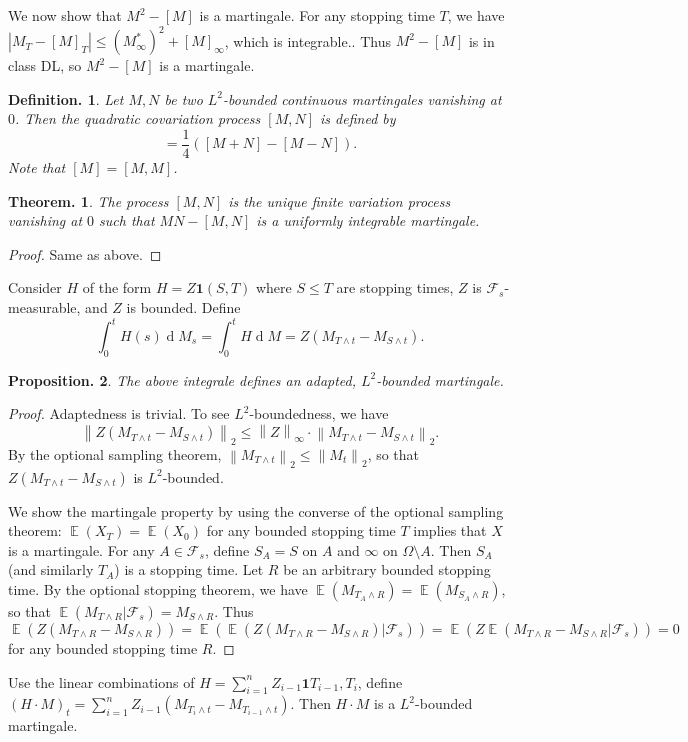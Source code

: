 \documentclass[11pt, a4paper]{memoir}
\newcommand{\norm}[1]{\ensuremath{\left\lVert#1\right\rVert}}
\theoremstyle{change}
\newtheorem{theorem}{Theorem.}[section]
\newtheorem{proposition}[theorem]{Proposition.}
\theoremstyle{plain}
\theoremstyle{nonumberplain}
\newtheorem{definition}{Definition.}
\newtheorem{proof}{Proof}
\DeclareMathOperator{\E}{{\mathbb{E}}}
\renewcommand{\d}[1]{\ensuremath{\operatorname{d}\!{#1}}}
\newcommand{\idc}{\mathbf{1}}
\numberwithin{equation}{section}
\begin{document}
We now show that $M^2-[M]$ is a martingale.
For any stopping time $T$, we have $|M_T-[M]_T|\leq(M_\infty^*)^2+[M]_\infty$, which is integrable..
Thus $M^2-[M]$ is in class DL, so $M^2-[M]$ is a martingale.
\begin{definition}
    Let $M,N$ be two $L^2$-bounded continuous martingales vanishing at $0$.
    Then the quadratic covariation process $[M,N]$ is defined by
    \begin{equation*}
        [M,N]=\frac{1}{4}([M+N]-[M-N]).
    \end{equation*}
    Note that $[M]=[M,M]$.
\end{definition}
\begin{theorem}
    The process $[M,N]$ is the unique finite variation process vanishing at $0$ such that $MN-[M,N]$ is a uniformly integrable martingale.
\end{theorem}
\begin{proof}
    Same as above.
\end{proof}
Consider $H$ of the form $H=Z\idc{(S,T)}$ where $S\leq T$ are stopping times, $Z$ is $\mathcal{F}_s$-measurable, and $Z$ is bounded.
Define
\begin{equation*}
    \int_0^tH(s)\d{M_s}=\int_0^t H\d{M}=Z(M_{T\wedge t}-M_{S\wedge t}).
\end{equation*}
\begin{proposition}
    The above integrale defines an adapted, $L^2$-bounded martingale.
\end{proposition}
\begin{proof}
    Adaptedness is trivial.
    To see $L^2$-boundedness, we have
    \begin{equation*}
        \norm{Z(M_{T\wedge t}-M_{S\wedge t})}_2\leq \norm{Z}_\infty\cdot\norm{M_{T\wedge t}-M_{S\wedge t}}_2.
    \end{equation*}
    By the optional sampling theorem, $\norm{M_{T\wedge t}}_2\leq\norm{M_t}_2$, so that $Z(M_{T\wedge t}-M_{S\wedge t})$ is $L^2$-bounded.

    We show the martingale property by using the converse of the optional sampling theorem: $\E(X_T)=\E(X_0)$ for any bounded stopping time $T$ implies that $X$ is a martingale.
    For any $A\in\mathcal{F}_s$, define $S_A=S$ on $A$ and $\infty$ on $\Omega\setminus A$.
    Then $S_A$ (and similarly $T_A$) is a stopping time.
    Let $R$ be an arbitrary bounded stopping time.
    By the optional stopping theorem, we have $\E(M_{T_A\wedge R})=\E(M_{S_A\wedge R})$, so that $\E(M_{T\wedge R}|\mathcal{F}_s)=M_{S\wedge R}$.
    Thus
    \begin{equation*}
        \E(Z(M_{T\wedge R}-M_{S\wedge R}))=\E(\E(Z(M_{T\wedge R}-M_{S\wedge R})|\mathcal{F}_s))=\E(Z\E(M_{T\wedge R}-M_{S\wedge R}|\mathcal{F}_s))=0
    \end{equation*}
    for any bounded stopping time $R$.
\end{proof}
Use the linear combinations of $H=\sum_{i=1}^n Z_{i-1}\idc{T_{i-1},T_i}$, define $(H\cdot M)_t=\sum_{i=1}^n Z_{i-1}(M_{T_i\wedge t}-M_{T_{i-1}\wedge t})$.
Then $H\cdot M$ is a $L^2$-bounded martingale.
\end{document}
